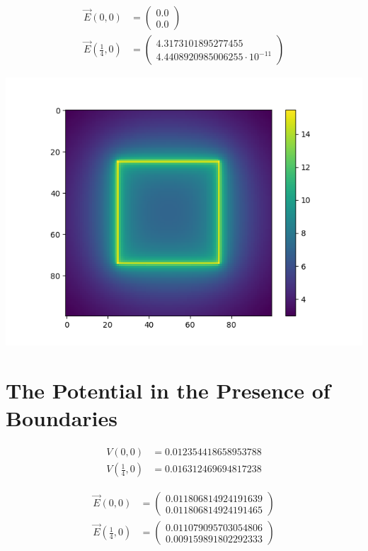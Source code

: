 \documentclass[10pt]{amsart}
\begin{document}
\begin{align*}
    \vec{E}(0,0) &= \begin{pmatrix}
       0.0 \\ 0.0
    \end{pmatrix}\\
    \vec{E}\left(\frac{1}{4},0\right) &= \begin{pmatrix}
      4.3173101895277455 \\  4.4408920985006255\cdot10^{-11}
    \end{pmatrix}
\end{align*}

\centering
\includegraphics[width=0.8\linewidth]{../P2_4.png}

\section{The Potential in the Presence of Boundaries}%
\label{sec:the_potential_in_the_presence_of_boundaries}

\begin{align*}
    V(0,0) &= 0.012354418658953788\\
    V\left(\frac{1}{4},0\right) &= 0.016312469694817238
\end{align*}

\begin{align*}
    \vec{E}(0,0) &= \begin{pmatrix}
       0.011806814924191639 \\ 0.011806814924191465
    \end{pmatrix}\\
    \vec{E}\left(\frac{1}{4},0\right) &= \begin{pmatrix}
      0.011079095703054806 \\  0.009159891802292333
    \end{pmatrix}
\end{align*}
\end{document}
